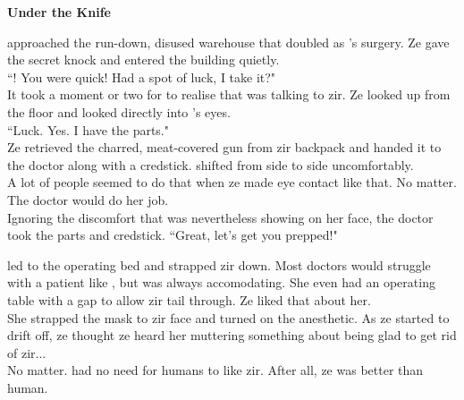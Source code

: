 \textbf{Under the Knife}

\protagonist{} approached the run-down, disused warehouse that doubled as \razordoc{}'s surgery. Ze gave the secret knock and entered the building quietly.\\
``\protagonist{}! You were quick! Had a spot of luck, I take it?"\\
It took a moment or two for \protagonist{} to realise that \razordoc{} was talking to zir. Ze looked up from the floor and looked directly into \razordoc{}'s eyes.\\
``Luck. Yes. I have the parts."\\
Ze retrieved the charred, meat-covered gun from zir backpack and handed it to the doctor along with a credstick. \razordoc{} shifted from side to side uncomfortably.\\
A lot of people seemed to do that when ze made eye contact like that. No matter. The doctor would do her job.\\
Ignoring the discomfort that was nevertheless showing on her face, the doctor took the parts and credstick. ``Great, let's get you prepped!"

\razordoc{} led \protagonist{} to the operating bed and strapped zir down. Most doctors would struggle with a patient like \protagonist{}, but \razordoc{} was always accomodating. She even had an operating table with a gap to allow zir tail through. Ze liked that about her.\\
She strapped the mask to zir face and turned on the anesthetic. As ze started to drift off, ze thought ze heard her muttering something about being glad to get rid of zir...\\
No matter. \protagonist{} had no need for humans to like zir. After all, ze was better than human.
%

